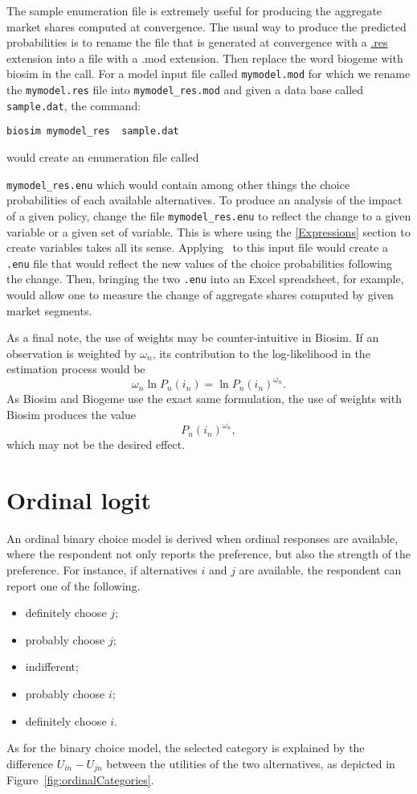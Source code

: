 \documentclass[12pt]{memoir}
\begin{document}
   The sample enumeration file is extremely useful for producing the
   aggregate market shares computed at convergence. The usual way to
   produce the predicted probabilities is to rename the file that is
   generated at convergence with a \hyperlink{res}{.res} extension
   into a file with a .mod extension. Then replace the word biogeme
   with biosim in the call.  For a model input file called
   \verb+mymodel.mod+ for which we rename the \verb+mymodel.res+ file
   into \verb+mymodel_res.mod+ and given a data base called
   \verb+sample.dat+, the command: 
{\footnotesize
\begin{verbatim} 
biosim mymodel_res  sample.dat 
\end{verbatim} would create an enumeration file called
}
   \verb+mymodel_res.enu+ which would contain among other things the
   choice probabilities of each available alternatives. To produce an
   analysis of the impact of a given policy, change the file
   \verb+mymodel_res.enu+ to reflect the change to a given variable or
   a given set of variable.  This is where using the
   \hyperlink{Expressions}{[Expressions]} section to create variables
   takes all its sense. Applying \BIOSIM\ to this input file would
   create a \verb+.enu+ file that would reflect the new values of the
   choice probabilities following the change. Then, bringing the two
   \verb+.enu+ into an Excel spreadsheet, for example, would allow one
   to measure the change of aggregate shares computed by given market
   segments.

As a final note, the use of weights may be counter-intuitive in
Biosim. If an observation is weighted by $\omega_n$, its
contribution to the log-likelihood in the estimation process would be 
\[
\omega_n \ln P_n(i_n) = \ln P_n(i_n)^{\omega_n}.
\]
As Biosim and Biogeme use the exact same formulation, the use of
weights with Biosim produces the value
\[
P_n(i_n)^{\omega_n},
\]
which may not be the desired effect. 

\section{Ordinal logit}
\label{sec:ordinal}

An ordinal binary choice model is derived when ordinal responses are
available, where the respondent not only reports the preference, but
also the strength of the preference. For instance, if alternatives $i$
and $j$ are available, the respondent can report one of the following.
\begin{itemize}
\item definitely choose $j$;
\item probably choose $j$;
\item indifferent;
\item probably choose $i$;
\item definitely choose $i$.
\end{itemize}
As for the binary choice model, the selected category is explained by the
difference $U_{in}-U_{jn}$ between the utilities of the two alternatives, as depicted in Figure~\ref{fig:ordinalCategories}.
\end{document}
